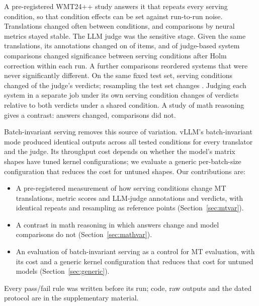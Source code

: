 A pre-registered WMT24++ study answers it \citep{deutsch2025wmt24pp} that repeats every serving condition, so that condition effects can be set against run-to-run noise. Translations changed often between conditions, and comparisons by neural metrics stayed stable. The LLM judge was the sensitive stage. Given the same translations, its annotations changed on \MtvJudgeBetween{} of items, and \XJudgeRobust{} of \MtvJudgeN{} judge-based system comparisons changed significance between serving conditions after Holm correction within each run. A further \XJudgeTies{} comparisons reordered systems that were never significantly different. On the same fixed test set, serving conditions changed \XServRate{} of the judge's verdicts; resampling the test set changes \XBootRate{}. Judging each system in a separate job under its own serving condition changes \XCrossDiffer{} of \XCrossN{} verdicts relative to both verdicts under a shared condition. A study of math reasoning gives a contrast: answers changed, comparisons did not.

Batch-invariant serving removes this source of variation. vLLM's batch-invariant mode produced identical outputs across all tested conditions for every translator and the judge. Its throughput cost depends on whether the model's matrix shapes have tuned kernel configurations; we evaluate a generic per-batch-size configuration that reduces the cost for untuned shapes. Our contributions are:
\begin{itemize}
\item A pre-registered measurement of how serving conditions change MT translations, metric scores and LLM-judge annotations and verdicts, with identical repeats and resampling as reference points (Section~\ref{sec:mtvar}).
\item A contrast in math reasoning in which answers change and model comparisons do not (Section~\ref{sec:mathvar}).
\item An evaluation of batch-invariant serving as a control for MT evaluation, with its cost and a generic kernel configuration that reduces that cost for untuned models (Section~\ref{sec:generic}).
\end{itemize}
Every pass/fail rule was written before its run; code, raw outputs and the dated protocol are in the supplementary material.

